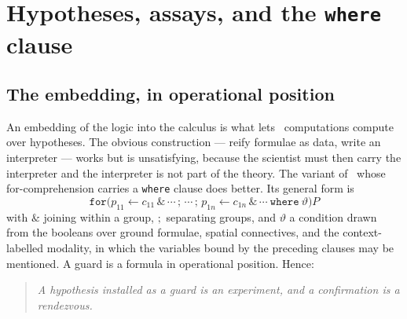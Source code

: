 \begin{table}[t]
\centering
{}
\caption{The three grades of access. The ladder is also an ordering by invasiveness
(\S\ref{sci:sec:exposure}), and in the opposite direction.}
\label{sci:tab:access}
\end{table}

\section{Hypotheses, assays, and the \texttt{where} clause}\label{sci:S4}
\label{sci:sec:assay}

\subsection{The embedding, in operational position}\label{sci:S4.1}

An embedding of the logic into the calculus is what lets \rhoc\ computations compute over hypotheses.
The obvious construction --- reify formulae as data, write an interpreter --- works but is
unsatisfying, because the scientist must then carry the interpreter and the interpreter is not part of
the theory. The variant of \rhoc\ whose for-comprehension carries a \texttt{where} clause
\cite[\S9]{Omnibus} does better. Its general form is
\[
\texttt{for}\big( p_{11} \leftarrow c_{11} \,\&\, \cdots \,;\, \cdots \,;\, p_{1n} \leftarrow c_{1n}
\,\&\, \cdots \ \texttt{where}\ \vartheta \big) P
\]
with $\&$ joining within a group, $;$ separating groups, and $\vartheta$ a condition drawn from the
booleans over ground formulae, spatial connectives, and the context-labelled modality, in which the
variables bound by the preceding clauses may be mentioned. A guard is a formula in operational
position. Hence:

\begin{quote}
\itshape A hypothesis installed as a guard is an experiment, and a confirmation is a rendezvous.
\end{quote}

